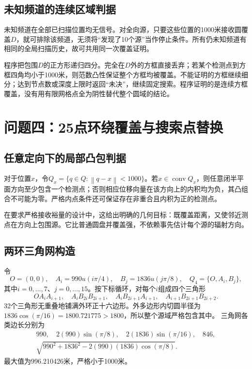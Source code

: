 \documentclass[UTF8,a4paper,zihao=-4,fontset=windows]{ctexart}
\newcommand{\norm}[1]{\left\lVert#1\right\rVert}
\begin{document}
\subsection{未知频道的连续区域判据}
未知频道在全部已扫描位置均无信号。对全向源，只要这些位置的1000米接收圆覆盖$D$，就可排除该频道，无须将“发现了10个源”当作停止条件。所有仍未知频道有相同的全局扫描历史，故可共用同一次覆盖证明。

程序把包围$D$的正方形递归四分。完全在$D$外的方框直接丢弃；若某个检测点到方框四角均小于1000米，则范数凸性保证整个方框均被覆盖。不能证明的方框继续细分；达到节点数或深度上限时返回“未决”，继续固定搜索。程序证明的是连续方框覆盖，没有用有限网格点全为阴性替代整个圆域的结论。

\section{问题四：25点环绕覆盖与搜索点替换}
\subsection{任意定向下的局部凸包判据}
对于位置$x$，令$Q_x=\{q\in Q:\norm{q-x}<1000\}$。若$x\in\operatorname{conv}Q_x$，则任意闭半平面方向至少包含一个检测点；否则相应位移向量在该方向上的内积均为负，其凸组合不可能为零。严格内点条件还可保证存在非重合且内积为正的检测点。

在要求严格接收裕量的设计中，这给出明确的几何目标：既覆盖距离，又使邻近测点在方向上包围源。它比普通圆盘并覆盖强，不依赖事先估计每个源的辐射方向。

\subsection{两环三角网构造}
令
\begin{equation}\label{eq:q4}
O=(0,0),\quad A_i=990u(i\pi/4),\quad
B_j=1836u(j\pi/8),\quad Q_4=\{O,A_i,B_j\},
\end{equation}
其中$i=0,\ldots,7$、$j=0,\ldots,15$。按下标循环，对每个$i$组成四个三角形
\begin{equation}
OA_iA_{i+1},\quad A_iB_{2i}B_{2i+1},\quad
A_iB_{2i+1}A_{i+1},\quad A_{i+1}B_{2i+1}B_{2i+2}.
\end{equation}
32个三角形无重叠地铺满外环正十六边形。外多边形内切圆半径为
$1836\cos(\pi/16)=1800.721775>1800$，所以整个源域严格包含其中。
三角网各类边长分别为
\begin{equation}
\begin{gathered}
990,\quad 2(990)\sin(\pi/8),\quad 2(1836)\sin(\pi/16),\quad846,\\
\sqrt{990^2+1836^2-2(990)(1836)\cos(\pi/8)}.
\end{gathered}
\end{equation}
最大值为996.210426米，严格小于1000米。
\end{document}
